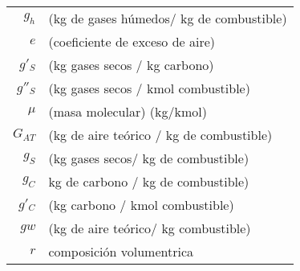 \documentclass[11pt,a4paper]{article}
\begin{document}
	\begin{cajita}
		\begin{multicols}{2}
			\begin{tabular}{r p{}}
				$g_{h}$ & (kg de gases húmedos/ kg de combustible)\\
				$e$ & (coeficiente de exceso de aire)\\
				$g'_{S}$ & (kg gases secos / kg carbono)\\
				$g''_{S}$ & (kg gases secos / kmol combustible)\\
				$\mu$ & (masa molecular) (kg/kmol)\\
				$G_{AT}$ & (kg de aire teórico / kg de combustible)\\
				$g_{S}$ & (kg gases secos/ kg de combustible)\\
				$g_{C}$ & kg de carbono / kg de combustible)\\
				$g'_{C}$ & (kg carbono / kmol combustible)\\
				$g{w}$ & (kg de aire teórico/ kg combustible)\\
				$r$ & composición volumentrica\\
				

\end{tabular}
\end{multicols}
\end{cajita}
\end{document}
